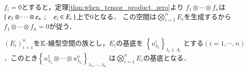 	\begin{prf}
		$f_i = 0$とすると，定理\ref{thm:when_tensor_product_zero}より
		$f_1 \otimes \cdots \otimes f_n$は
		$\left\{\ e_1 \otimes \cdots \otimes e_n\ \, ; \quad e_i \in E_i\ \right\}$上で0となる．
		この空間は$\bigotimes_{i=1}^{n} E_i$を生成するから
		$f_1 \otimes \cdots \otimes f_n = 0$が従う．
		\QED
	\end{prf}
	
	\begin{screen}
		\begin{thm}[テンソル積の基底]\label{thm:basis_of_tensor_product}
			$(E_i)_{i=1}^n$を$\mathbb{K}$-線型空間の族とし，$E_i$の基底を
			$\left\{ u^i_{\lambda_i} \right\}_{\lambda_i \in \Lambda_i}$
			とする$(i=1,\cdots,n)$．このとき$\left\{ u^1_{\lambda_1} \otimes 
			\cdots \otimes u^n_{\lambda_n} \right\}_{\lambda_1,\cdots,\lambda_n}$
			は$\bigotimes_{i=1}^n E_i$の基底となる．
		\end{thm}
	\end{screen}
	
